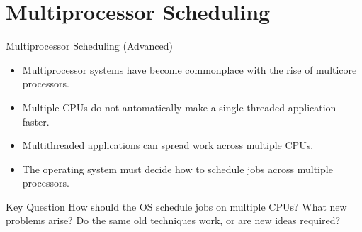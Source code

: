 
\section{Multiprocessor Scheduling}

\begin{frame}{Multiprocessor Scheduling (Advanced)}

\begin{itemize}
    \item Multiprocessor systems have become commonplace with the rise of
    multicore processors.

    \item Multiple CPUs do not automatically make a single-threaded
    application faster.

    \item Multithreaded applications can spread work across multiple CPUs.

    \item The operating system must decide how to schedule jobs across
    multiple processors.
\end{itemize}

\vspace{0.3cm}

\begin{block}{Key Question}
How should the OS schedule jobs on multiple CPUs? What new problems arise?
Do the same old techniques work, or are new ideas required?
\end{block}

\end{frame}

